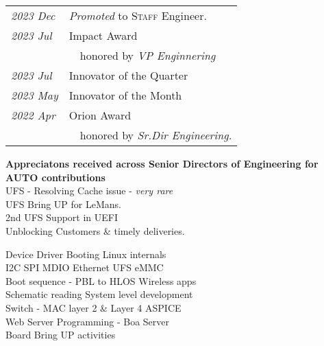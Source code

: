 %
%
%
%
%
\small{
   \begin{tabularx}{\textwidth}{X l}
      \textit{2023 Dec} & \emph{Promoted} to \textsc{Staff} Engineer.\\
      \textit{2023 Jul} & Impact Award \\
      & {~~}{\footnotesize honored by \textit{VP Enginnering}} \\        %
      \textit{2023 Jul} & Innovator of the Quarter \\
      \textit{2023 May} & Innovator of the Month \\
      \textit{2022 Apr} & Orion Award \\
      & {~~}{\footnotesize honored by \textit{Sr.Dir Engineering.}} \\
   \end{tabularx}
} %

%
%
%
%
\footnotesize{
   \textbf{Appreciatons received across Senior Directors of Engineering for AUTO contributions} \\
   \BAspaceBullet UFS - Resolving Cache issue - \emph{very rare} \\
   \BAspaceBullet UFS \textendash{} Bring UP for LeMans. \\
   \BAspaceBullet 2nd UFS Support in UEFI \\
   \BAspaceBullet Unblocking Customers \& timely deliveries.
}

%
%
%
%
   \BAspaceBullet Device Driver \BAspaceBullet Booting \BAspaceBullet Linux internals \\
   \BAspaceBullet I2C \BAspaceBullet SPI \BAspaceBullet MDIO \BAspaceBullet Ethernet \BAspaceBullet UFS \BAspaceBullet eMMC \\ 
   \BAspaceBullet Boot sequence - PBL to HLOS \BAspaceBullet Wireless apps\\
   \BAspaceBullet Schematic reading \BAspaceBullet System level development \\
   \BAspaceBullet Switch - MAC layer 2 \& Layer 4 \BAspaceBullet ASPICE \\
   \BAspaceBullet Web Server Programming - Boa Server \\
   \BAspaceBullet Board Bring UP activities \\
\sectionsep

